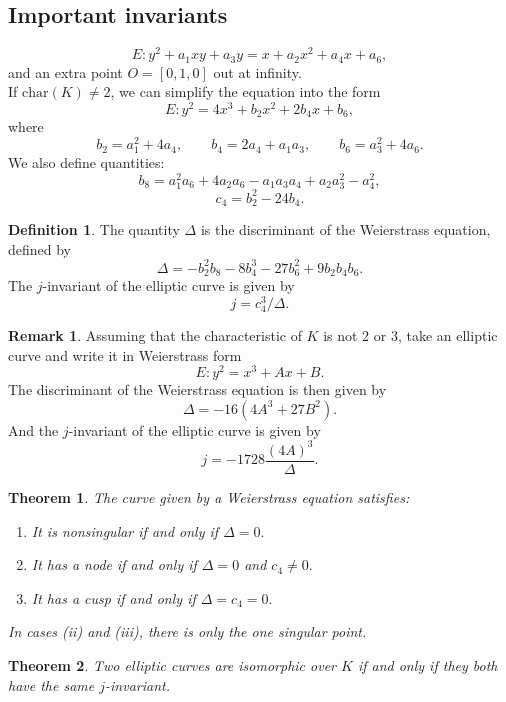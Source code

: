 \documentclass[12pt]{article}
\newtheorem{theorem}{Theorem}[subsection]
\theoremstyle{remark}
\theoremstyle{definition}
\newtheorem{remark}{Remark}[subsection]
\newtheorem{definition}{Definition}[subsection]
\begin{document}
    \subsection{Important invariants}
    $$E: y^2+a_1xy+a_3y=x+a_2x^2+a_4x+a_6,$$ and an extra point $O=[0,1,0]$ out at infinity.\\
    If $\text{char}(K)\neq 2$, we can simplify the equation into the form $$E: y^2=4x^3+b_2x^2+2b_4x+b_6,$$ where $$b_2=a_1^2+4a_4,\qquad b_4=2a_4+a_1a_3,\qquad  b_6=a_3^2+4a_6.$$
    We also define quantities:
    $$b_8=a_1^2a_6+4a_2a_6-a_1a_3a_4+a_2a_3^2-a_4^2,$$
    $$c_4=b_2^2-24b_4.$$
    \begin{definition}
        The quantity $\Delta$ is the discriminant of the Weierstrass equation, defined by $$\Delta =-b_2^2b_8-8b_4^3-27b_6^2+9b_2b_4b_6.$$ The $j$-invariant of the elliptic curve is given by $$j=c_4^3/\Delta .$$
    \end{definition}
    \begin{remark}
    Assuming that the characteristic of $K$ is not 2 or 3, take an elliptic curve and write it in Weierstrass form $$E: y^2=x^3+Ax+B.$$ 
    The discriminant of the Weierstrass equation is then given by $$\Delta = -16(4A^3+27B^2).$$
    And the $j$-invariant of the elliptic curve is given by $$j= -1728\frac{(4A)^3}{\Delta }.$$
    \end{remark}
    \begin{theorem}
        The curve given by a Weierstrass equation satisfies:
        \begin{enumerate}[\normalfont(i)]
            \item It is nonsingular if and only if $\Delta =0.$
            \item It has a node if and only if $\Delta =0$ and $c_4\neq 0.$
            \item It has a cusp if and only if $\Delta =c_4=0.$
        \end{enumerate}
        In cases (ii) and (iii), there is only the one singular point.
    \end{theorem}
    \begin{theorem}
        Two elliptic curves are isomorphic over $K$ if and only if they both have the same $j$-invariant.
    \end{theorem}
\end{document}
